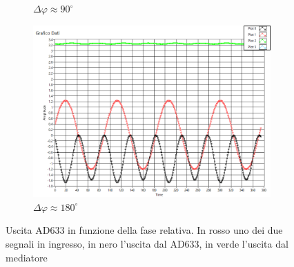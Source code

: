\documentclass[a4paper]{article}
\begin{document}
\begin{figure}[!h]
\begin{subfigure}[b]{0.7\textwidth}
        \caption{$\Delta \varphi \approx 90^{\circ}$}
        \label{fig:mouse}
    \end{subfigure}
    \begin{subfigure}[b]{0.7\textwidth}
        \includegraphics[width=\textwidth]{es25_800hz_100nF_180deg}
        \caption{$\Delta \varphi \approx 180^{\circ}$}
        \label{fig:mouse}
    \end{subfigure}
\caption{Uscita AD633 in funzione della fase relativa. In rosso uno dei due segnali in ingresso, in nero l'uscita dal AD633, in verde l'uscita dal mediatore}
\label{subfig3}
\end{figure}
\end{document}
